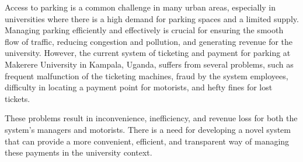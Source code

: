 Access to parking is a common challenge in many urban areas, especially in universities where there is a high demand for parking spaces and a limited supply.
Managing parking efficiently and effectively is crucial for ensuring the smooth flow of traffic, reducing congestion and pollution, and generating revenue for the university.
However, the current system of ticketing and payment for parking at Makerere University in Kampala, Uganda, suffers from several problems, such as frequent malfunction of the ticketing machines, fraud by the system employees, difficulty in locating a payment point for motorists, and hefty fines for lost tickets.

These problems result in inconvenience, inefficiency, and revenue loss for both the system’s managers and motorists. There is a need for developing a novel system that can provide a more convenient, efficient, and transparent way of managing these payments in the university context.



